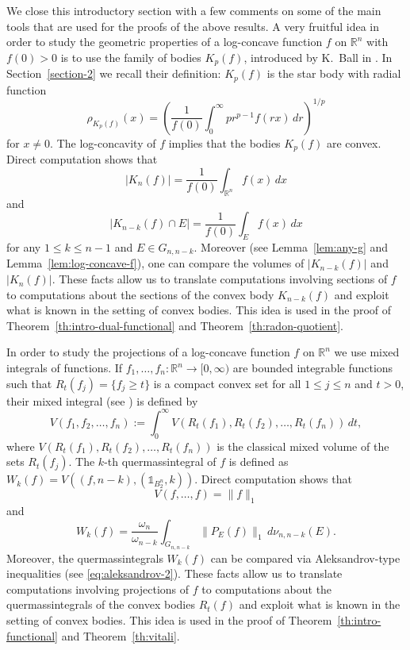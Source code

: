 \documentclass[11pt,leqno]{article}
\theoremstyle{definition}
\theoremstyle{remark}
\numberwithin{equation}{section}
\newcommand{\ls}{\leqslant}
\newcommand{\gr}{\geqslant}
\newcommand{\1}{\textbf{1}}
\begin{document}
We close this introductory section with a few comments on some of the main tools that are used for the
proofs of the above results. A very fruitful idea in order to study the geometric properties of a log-concave function $f$
on ${\mathbb R}^n$ with $f(0)>0$ is to use the family of bodies $K_p(f)$, introduced by K.~Ball in \cite{Ball-1988}. In Section~\ref{section-2} we recall their definition: $K_p(f)$ is the star body with radial function
$$\rho_{K_p(f)}(x)=\left (\frac{1}{f(0)}\int_0^{\infty}pr^{p-1}f(rx)\,dr\right )^{1/p}$$ for $x\neq 0$. The
log-concavity of $f$ implies that the bodies $K_p(f)$ are convex. Direct computation
shows that
$$|K_n(f)|=\frac{1}{f(0)}\int_{{\mathbb R}^n}f(x)\,dx$$
and
$$|K_{n-k}(f)\cap E|=\frac{1}{f(0)}\int_Ef(x)\,dx$$
for any $1\ls k\ls n-1$ and $E\in G_{n,n-k}$. Moreover (see Lemma~\ref{lem:any-g} and
Lemma~\ref{lem:log-concave-f}), one can compare the volumes of $|K_{n-k}(f)|$ and $|K_n(f)|$. These facts allow us
to translate computations involving sections of $f$ to computations about the sections of the convex
body $K_{n-k}(f)$ and exploit what is known in the setting of convex bodies. This idea is used in the
proof of Theorem~\ref{th:intro-dual-functional} and Theorem~\ref{th:radon-quotient}.

In order to study the projections of a log-concave function $f$ on ${\mathbb R}^n$ we use
mixed integrals of functions. If $f_1,\ldots ,f_n:{\mathbb R}^n\to [0,\infty)$
are bounded integrable functions such that $R_t(f_j)=\{f_j\gr t\}$ is a compact convex set
for all $1\ls j\ls n$ and $t>0$, their mixed integral (see \cite{VMilman-Rotem-2013}) is defined by
$$V(f_1,f_2,\ldots ,f_n):=\int_0^{\infty}V(R_t(f_1),R_t(f_2),\ldots ,R_t(f_n))\,dt,$$
where $V(R_t(f_1),R_t(f_2),\ldots ,R_t(f_n))$ is the classical mixed volume of the sets $R_t(f_j)$.
The $k$-th quermassintegral of $f$ is defined as $W_k(f)=V((f,n-k),(\mathds{1}_{B_2^n},k))$. Direct computation shows that
$$V(f,\ldots ,f)=\|f\|_1$$
and
$$W_k(f) =\frac{\omega_n}{\omega_{n-k}}\int_{G_{n,n-k}}\|P_E(f)\|_1\,d\nu_{n,n-k}(E).$$
Moreover, the quermassintegrals $W_k(f)$ can be compared via Aleksandrov-type inequalities
(see \eqref{eq:aleksandrov-2}). These facts allow us to translate computations involving projections of $f$
to computations about the quermassintegrals of the convex
bodies $R_t(f)$ and exploit what is known in the setting of convex bodies. This idea is used in the
proof of Theorem~\ref{th:intro-functional} and Theorem~\ref{th:vitali}.



\end{document}
